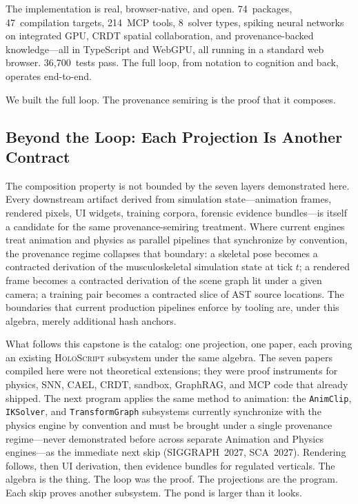 \documentclass[sigchi-a]{acmart}
\newcommand{\holoscript}{\textsc{HoloScript}}
\begin{document}
The implementation is real, browser-native, and open. 74~packages,
47~compilation targets, 214~MCP tools, 8~solver types, spiking neural
networks on integrated GPU, CRDT spatial collaboration, and
provenance-backed knowledge---all in TypeScript and WebGPU, all running in
a standard web browser. 36,700~tests pass. The full loop, from notation to
cognition and back, operates end-to-end.

We built the full loop. The provenance semiring is the proof that it
composes.

\subsection{Beyond the Loop: Each Projection Is Another Contract}
\label{sec:beyond-the-loop}

The composition property is not bounded by the seven layers demonstrated
here. Every downstream artifact derived from simulation state---animation
frames, rendered pixels, UI widgets, training corpora, forensic evidence
bundles---is itself a candidate for the same provenance-semiring treatment.
Where current engines treat animation and physics as parallel pipelines
that synchronize by convention, the provenance regime collapses that
boundary: a skeletal pose becomes
a contracted derivation of the musculoskeletal simulation state at tick
$t$; a rendered frame becomes a contracted derivation of the scene graph
lit under a given camera; a training pair becomes a contracted slice of
AST source locations. The boundaries that current production pipelines
enforce by tooling are, under this algebra, merely additional hash
anchors.

What follows this capstone is the catalog: one projection, one paper,
each proving an existing \holoscript{} subsystem under the same algebra.
The seven papers compiled here were not theoretical extensions; they
were proof instruments for physics, SNN, CAEL, CRDT, sandbox, GraphRAG,
and MCP code that already shipped. The next program applies the same
method to animation: the \texttt{AnimClip}, \texttt{IKSolver}, and
\texttt{TransformGraph} subsystems currently synchronize with the
physics engine by convention and must be brought under a single
provenance regime---never demonstrated before across separate
Animation and Physics engines---as the immediate next skip (SIGGRAPH~2027,
SCA~2027). Rendering follows, then UI derivation, then evidence bundles
for regulated verticals. The algebra is the thing. The loop was the
proof. The projections are the program. Each skip proves another
subsystem. The pond is larger than it looks.
\end{document}
